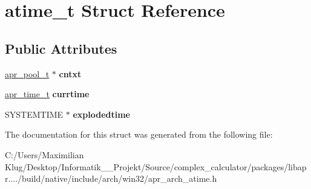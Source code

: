 \hypertarget{structatime__t}{}\section{atime\+\_\+t Struct Reference}
\label{structatime__t}
\subsection*{Public Attributes}
\begin{DoxyCompactItemize}
\item 
\mbox{\label{structatime__t_a044503913be52273e8af26faed71b3b0}} 
\mbox{\hyperlink{group__apr__pools_gaf137f28edcf9a086cd6bc36c20d7cdfb}{apr\+\_\+pool\+\_\+t}} $\ast$ {\bfseries cntxt}
\item 
\mbox{\label{structatime__t_a653999daf44e25a51b89ed6d41fdb046}} 
\mbox{\hyperlink{group__apr__time_gadb4bde16055748190eae190c55aa02bb}{apr\+\_\+time\+\_\+t}} {\bfseries currtime}
\item 
\mbox{\label{structatime__t_a1bf50d7bf5fd446531357c3b0a33eabf}} 
S\+Y\+S\+T\+E\+M\+T\+I\+ME $\ast$ {\bfseries explodedtime}
\end{DoxyCompactItemize}


The documentation for this struct was generated from the following file\+:\begin{DoxyCompactItemize}
\item 
C\+:/\+Users/\+Maximilian Klug/\+Desktop/\+Informatik\+\_\+\_\+\+Projekt/\+Source/complex\+\_\+calculator/packages/libapr..../build/native/include/arch/win32/apr\+\_\+arch\+\_\+atime.\+h\end{DoxyCompactItemize}
